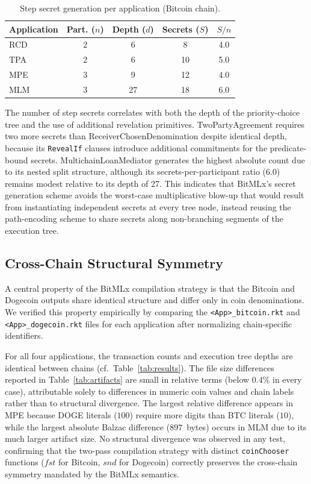 \documentclass[journal]{IEEEtran}
\begin{document}
\begin{table}[t]
\caption{Step secret generation per application (Bitcoin chain).}
\label{tab:secrets}
\centering
\footnotesize
\begin{tabular}{lcccc}
\toprule
Application & Part. ($n$) & Depth ($d$) & Secrets ($S$) & $S/n$ \\
\midrule
RCD & 2 & 6 & 8 & 4.0 \\
TPA & 2 & 6 & 10 & 5.0 \\
MPE & 3 & 9 & 12 & 4.0 \\
MLM & 3 & 27 & 18 & 6.0 \\
\bottomrule
\end{tabular}
\end{table}

The number of step secrets correlates with both the depth of the priority-choice tree and the use of additional revelation primitives. TwoPartyAgreement requires two more secrets than ReceiverChosenDenomination despite identical depth, because its \texttt{RevealIf} clauses introduce additional commitments for the predicate-bound secrets. MultichainLoanMediator generates the highest absolute count due to its nested split structure, although its secrets-per-participant ratio (6.0) remains modest relative to its depth of 27. This indicates that BitMLx's secret generation scheme avoids the worst-case multiplicative blow-up that would result from instantiating independent secrets at every tree node, instead reusing the path-encoding scheme to share secrets along non-branching segments of the execution tree.

\subsection{Cross-Chain Structural Symmetry}

A central property of the BitMLx compilation strategy is that the Bitcoin and Dogecoin outputs share identical structure and differ only in coin denominations. We verified this property empirically by comparing the \texttt{<App>\_bitcoin.rkt} and \texttt{<App>\_dogecoin.rkt} files for each application after normalizing chain-specific identifiers.

For all four applications, the transaction counts and execution tree depths are identical between chains (cf.\ Table~\ref{tab:results}). The file size differences reported in Table~\ref{tab:artifacts} are small in relative terms (below $0.4\%$ in every case), attributable solely to differences in numeric coin values and chain labels rather than to structural divergence. The largest relative difference appears in MPE because DOGE literals ($100$) require more digits than BTC literals ($10$), while the largest absolute Balzac difference ($897$~bytes) occurs in MLM due to its much larger artifact size. No structural divergence was observed in any test, confirming that the two-pass compilation strategy with distinct \texttt{coinChooser} functions ($\mathit{fst}$ for Bitcoin, $\mathit{snd}$ for Dogecoin) correctly preserves the cross-chain symmetry mandated by the BitMLx semantics.
\end{document}
